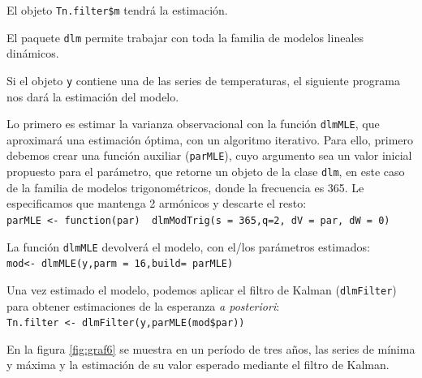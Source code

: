 \documentclass[12pt]{article}\usepackage[]{graphicx}\usepackage[]{color}
\begin{document}
El objeto \verb|Tn.filter$m| tendrá la estimación.
% 
% 
% 
 
El paquete \verb|dlm| permite trabajar con toda la familia de modelos lineales dinámicos. %

Si el objeto \verb|y| contiene una de las series de temperaturas, el siguiente programa nos dará la estimación del modelo.

Lo primero es estimar la varianza observacional con la función \verb|dlmMLE|, que aproximará una estimación óptima, con un algoritmo iterativo. Para ello, primero debemos crear una función auxiliar (\verb|parMLE|), cuyo argumento sea un valor inicial propuesto para el parámetro, que retorne un objeto de la clase \verb|dlm|, en este caso de la familia de modelos trigonométricos, donde la frecuencia es 365. Le especificamos que mantenga 2 armónicos y descarte el resto:\\
\verb|parMLE <- function(par)  dlmModTrig(s = 365,q=2, dV = par, dW = 0)|

La función \verb|dlmMLE| devolverá el modelo, con el/los parámetros estimados:\\
\verb|mod<- dlmMLE(y,parm = 16,build= parMLE)|

Una vez estimado el modelo, podemos aplicar el filtro de Kalman (\verb|dlmFilter|) para obtener estimaciones de la esperanza \textit{a posteriori}:\\
\verb|Tn.filter <- dlmFilter(y,parMLE(mod$par))|

En la figura \ref{fig:graf6} se muestra en un período de tres años, las series de mínima y máxima y la estimación de su valor esperado mediante el filtro de Kalman.
\end{document}
